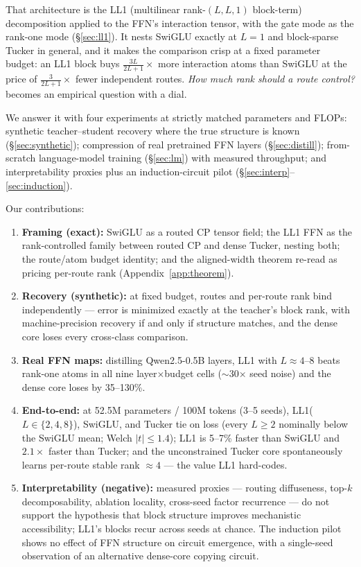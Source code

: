 \documentclass[11pt]{article}
\begin{document}
That architecture is the LL1 (multilinear rank-$(L,L,1)$ block-term) decomposition
\citep{delathauwer2008blockterm} applied to the FFN's interaction tensor, with the
gate mode as the rank-one mode (\S\ref{sec:ll1}). It nests SwiGLU exactly at $L{=}1$
and block-sparse Tucker in general, and it makes the comparison crisp at a fixed
parameter budget: an LL1 block buys $\tfrac{3L}{2L+1}\times$ more interaction atoms
than SwiGLU at the price of $\tfrac{3}{2L+1}\times$ fewer independent routes.
\emph{How much rank should a route control?} becomes an empirical question with a
dial.

We answer it with four experiments at strictly matched parameters and FLOPs:
synthetic teacher--student recovery where the true structure is known
(\S\ref{sec:synthetic}); compression of real pretrained FFN layers
(\S\ref{sec:distill}); from-scratch language-model training (\S\ref{sec:lm}) with
measured throughput; and interpretability proxies plus an induction-circuit pilot
(\S\ref{sec:interp}--\ref{sec:induction}).

Our contributions:
\begin{enumerate}
\item \textbf{Framing (exact):} SwiGLU as a routed CP tensor field; the LL1 FFN as
  the rank-controlled family between routed CP and dense Tucker, nesting both; the
  route/atom budget identity; and the aligned-width theorem re-read as pricing
  per-route rank (Appendix~\ref{app:theorem}).
\item \textbf{Recovery (synthetic):} at fixed budget, routes and per-route rank bind
  independently --- error is minimized exactly at the teacher's block rank, with
  machine-precision recovery if and only if structure matches, and the dense core
  loses every cross-class comparison.
\item \textbf{Real FFN maps:} distilling Qwen2.5-0.5B layers, LL1 with
  $L\approx4$--$8$ beats rank-one atoms in all nine layer$\times$budget cells
  ($\sim$30$\times$ seed noise) and the dense core loses by 35--130\%.
\item \textbf{End-to-end:} at 52.5M parameters / 100M tokens (3--5 seeds),
  LL1($L\in\{2,4,8\}$), SwiGLU, and Tucker tie on loss (every $L\ge2$ nominally below
  the SwiGLU mean; Welch $|t|\le1.4$); LL1 is 5--7\% faster than SwiGLU and $2.1\times$
  faster than Tucker; and the unconstrained Tucker core spontaneously learns
  per-route stable rank $\approx 4$ --- the value LL1 hard-codes.
\item \textbf{Interpretability (negative):} measured proxies — routing diffuseness,
  top-$k$ decomposability, ablation locality, cross-seed factor recurrence — do not
  support the hypothesis that block structure improves mechanistic accessibility;
  LL1's blocks recur across seeds at chance. The induction pilot shows no effect of
  FFN structure on circuit emergence, with a single-seed observation of an
  alternative dense-core copying circuit.
\end{enumerate}
\end{document}
